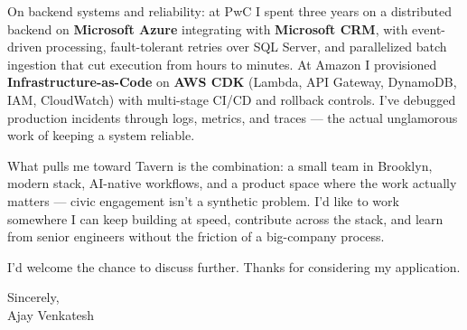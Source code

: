 \documentclass[letterpaper,11pt]{article}
\begin{document}
On backend systems and reliability: at PwC I spent three years on a distributed backend on \textbf{Microsoft Azure} integrating with \textbf{Microsoft CRM}, with event-driven processing, fault-tolerant retries over SQL Server, and parallelized batch ingestion that cut execution from hours to minutes. At Amazon I provisioned \textbf{Infrastructure-as-Code} on \textbf{AWS CDK} (Lambda, API Gateway, DynamoDB, IAM, CloudWatch) with multi-stage CI/CD and rollback controls. I've debugged production incidents through logs, metrics, and traces --- the actual unglamorous work of keeping a system reliable.

What pulls me toward Tavern is the combination: a small team in Brooklyn, modern stack, AI-native workflows, and a product space where the work actually matters --- civic engagement isn't a synthetic problem. I'd like to work somewhere I can keep building at speed, contribute across the stack, and learn from senior engineers without the friction of a big-company process.

I'd welcome the chance to discuss further. Thanks for considering my application.

\vspace{12pt}

Sincerely, \\
Ajay Venkatesh
\end{document}
